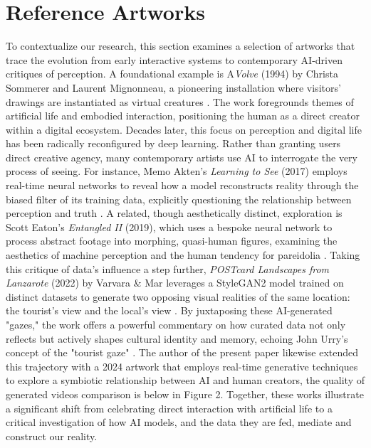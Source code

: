 \documentclass[sigconf,nonacm]{acmart}
\begin{document}
\section{Reference Artworks}

To contextualize our research, this section examines a selection of artworks that trace the evolution from early interactive systems to contemporary AI-driven critiques of perception. A foundational example is A\textendash \textit{Volve} (1994) by Christa Sommerer and Laurent Mignonneau, a pioneering installation where visitors' drawings are instantiated as virtual creatures \cite{AVolve}. The work foregrounds themes of artificial life and embodied interaction, positioning the human as a direct creator within a digital ecosystem. Decades later, this focus on perception and digital life has been radically reconfigured by deep learning. Rather than granting users direct creative agency, many contemporary artists use AI to interrogate the very process of seeing. For instance, Memo Akten's \textit{Learning to See} (2017) employs real-time neural networks to reveal how a model reconstructs reality through the biased filter of its training data, explicitly questioning the relationship between perception and truth \cite{LearningToSeeWeb,LearningToSeePaper}. A related, though aesthetically distinct, exploration is Scott Eaton's \textit{Entangled II} (2019), which uses a bespoke neural network to process abstract footage into morphing, quasi-human figures, examining the aesthetics of machine perception and the human tendency for pareidolia \cite{EntangledII}. Taking this critique of data's influence a step further, \textit{POSTcard Landscapes from Lanzarote} (2022) by Varvara \& Mar leverages a StyleGAN2 model trained on distinct datasets to generate two opposing visual realities of the same location: the tourist's view and the local's view \cite{Guljajeva2022}. By juxtaposing these AI-generated "gazes," the work offers a powerful commentary on how curated data not only reflects but actively shapes cultural identity and memory, echoing John Urry's concept of the "tourist gaze" \cite{Urry2002}. The author of the present paper likewise extended this trajectory with a 2024 artwork that employs real-time generative techniques to explore a symbiotic relationship between AI and human creators, the quality of generated videos comparison is below in Figure 2. Together, these works illustrate a significant shift from celebrating direct interaction with artificial life to a critical investigation of how AI models, and the data they are fed, mediate and construct our reality.
\end{document}
